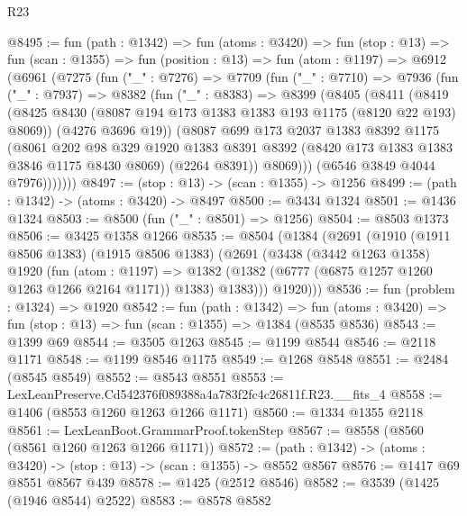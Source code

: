 \begin{lexlean}{R23}
\begin{coremodule}
@8495 := fun (path : @1342) =>
  fun (atoms : @3420) =>
  fun (stop : @13) =>
  fun (scan : @1355) =>
  fun (position : @13) =>
  fun (atom : @1197) =>
  @6912
    (@6961
      (@7275
        (fun ("_" : @7276) =>
        @7709
          (fun ("_" : @7710) =>
          @7936
            (fun ("_" : @7937) =>
            @8382
              (fun ("_" : @8383) =>
              @8399
                (@8405
                  (@8411
                    (@8419
                      (@8425 @8430 (@8087 @194 @173 @1383 @1383 @193 @1175 (@8120 @22 @193) @8069))
                      (@4276 @3696 @19))
                    (@8087
                      @699
                      @173
                      @2037
                      @1383
                      @8392
                      @1175
                      (@8061
                        @202
                        @98
                        @329
                        @1920
                        @1383
                        @8391
                        @8392
                        (@8420 @173 @1383 @1383 @3846 @1175 @8430 @8069)
                        (@2264 @8391))
                      @8069)))
                (@6546 @3849 @4044 @7976)))))))
@8497 := (stop : @13) -> (scan : @1355) -> @1256
@8499 := (path : @1342) -> (atoms : @3420) -> @8497
@8500 := @3434 @1324
@8501 := @1436 @1324
@8503 := @8500 (fun ("_" : @8501) => @1256)
@8504 := @8503 @1373
@8506 := @3425 @1358 @1266
@8535 := @8504
    (@1384
      (@2691
        (@1910
          (@1911 @8506 @1383)
          (@1915 @8506 @1383)
          (@2691
            (@3438
              (@3442 @1263 @1358)
              @1920
              (fun (atom : @1197) =>
              @1382 (@1382 (@6777 (@6875 @1257 @1260 @1263 @1266 @2164 @1171)) @1383) @1383)))
          @1920)))
@8536 := fun (problem : @1324) => @1920
@8542 := fun (path : @1342) =>
  fun (atoms : @3420) => fun (stop : @13) => fun (scan : @1355) => @1384 (@8535 @8536)
@8543 := @1399 @69
@8544 := @3505 @1263
@8545 := @1199 @8544
@8546 := @2118 @1171
@8548 := @1199 @8546 @1175
@8549 := @1268 @8548
@8551 := @2484 (@8545 @8549)
@8552 := @8543 @8551
@8553 := LexLeanPreserve.Cd542376f089388a4a783f2fc4c26811f.R23.__fits_4
@8558 := @1406 (@8553 @1260 @1263 @1266 @1171)
@8560 := @1334 @1355 @2118
@8561 := LexLeanBoot.GrammarProof.tokenStep
@8567 := @8558 (@8560 (@8561 @1260 @1263 @1266 @1171))
@8572 := (path : @1342) -> (atoms : @3420) -> (stop : @13) -> (scan : @1355) -> @8552 @8567
@8576 := @1417 @69 @8551 @8567 @439
@8578 := @1425 (@2512 @8546)
@8582 := @3539 (@1425 (@1946 @8544) @2522)
@8583 := @8578 @8582

\end{coremodule}
\end{lexlean}

